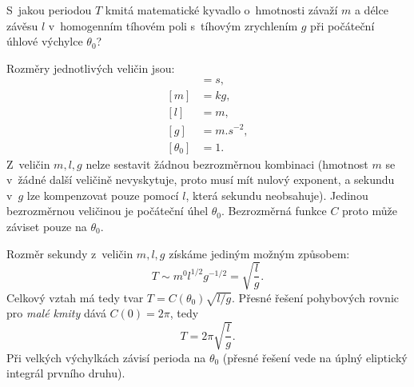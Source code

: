 \begin{priklad}
    S~jakou periodou $T$ kmitá matematické kyvadlo o~hmotnosti závaží $m$ a délce závěsu $l$ v~homogenním tíhovém poli s~tíhovým zrychlením $g$ při počáteční úhlové výchylce $\theta_0$?

    Rozměry jednotlivých veličin jsou:
    \begin{align*}
        [T] &= \unit{s},\\
        [m] &= \unit{kg},\\
        [l] &= \unit{m},\\
        [g] &= \unit{m.s^{-2}},\\
        [\theta_0] &= 1.
    \end{align*}
    Z~veličin $m, l, g$ nelze sestavit žádnou bezrozměrnou kombinaci (hmotnost $m$ se v~žádné další veličině nevyskytuje, proto musí mít nulový exponent, a sekundu v~$g$ lze kompenzovat pouze pomocí $l$, která sekundu neobsahuje). Jedinou bezrozměrnou veličinou je počáteční úhel $\theta_0$. Bezrozměrná funkce $C$ proto může záviset pouze na $\theta_0$.

    Rozměr sekundy z~veličin $m, l, g$ získáme jediným možným způsobem:
    $$ T \sim m^0 l^{1/2} g^{-1/2} = \sqrt{\frac{l}{g}}. $$
    Celkový vztah má tedy tvar $T = C(\theta_0) \sqrt{l/g}$.
    Přesné řešení pohybových rovnic pro \emph{malé kmity} dává $C(0) = 2\pi$, tedy
    $$ T = 2\pi\sqrt{\frac{l}{g}}. $$
    Při velkých výchylkách závisí perioda na $\theta_0$ (přesné řešení vede na úplný eliptický integrál prvního druhu).
\end{priklad}

